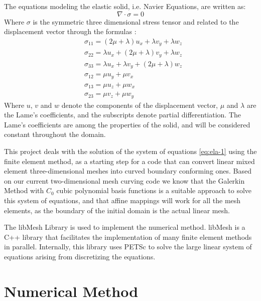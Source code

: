 \documentclass[letter,12pt]{article}
\begin{document}
The equations modeling the elastic solid, i.e. Navier Equations, are 
written as\cite{lai}:
%
\begin{equation}
\label{eq:ela-1}
\nabla \cdot \sigma = 0
\end{equation}
%
Where $\sigma$ is the symmetric three dimensional stress tensor and
related to the displacement vector through the formulas :
%
\begin{align*}
& \sigma_{11} = (2 \mu + \lambda) u_x + \lambda v_y +  \lambda w_z \\
& \sigma_{22} = \lambda u_x + (2 \mu + \lambda) v_y +  \lambda w_z \\
& \sigma_{33} = \lambda u_x + \lambda v_y +  (2 \mu + \lambda) w_z \\
& \sigma_{12} = \mu u_y + \mu v_x \\
& \sigma_{13} = \mu u_z + \mu w_x \\
& \sigma_{23} = \mu v_z + \mu w_y
\end{align*}
%
Where $u$, $v$ and $w$ denote the components of the displacement
vector, $\mu$ and $\lambda$ are the Lame's coefficients, and the
subscripts denote partial differentiation. The Lame's coefficients are
among the properties of the solid, and will be considered constant
throughout the domain.

This project deals with the solution of the system of equations
\eqref{eq:ela-1} using the finite element method, as a starting step for
a code that can convert linear mixed element three-dimensional meshes
into curved boundary conforming ones.  Based on our current
two-dimensional mesh curving code we know that the Galerkin Method
with $C_0$ cubic polynomial basis functions is a suitable approach to
solve this system of equations, and that affine mappings will work for
all the mesh elements, as the boundary of the initial domain is the
actual linear mesh.

The libMesh\cite{kirk} Library is used to implement the numerical
method. libMesh is a C++ library that facilitates the implementation
of many finite element methods in parallel. Internally, this library
uses PETSc\cite{balay} to solve the large linear system of equations
arising from discretizing the equations.

\section{Numerical Method}
\end{document}
